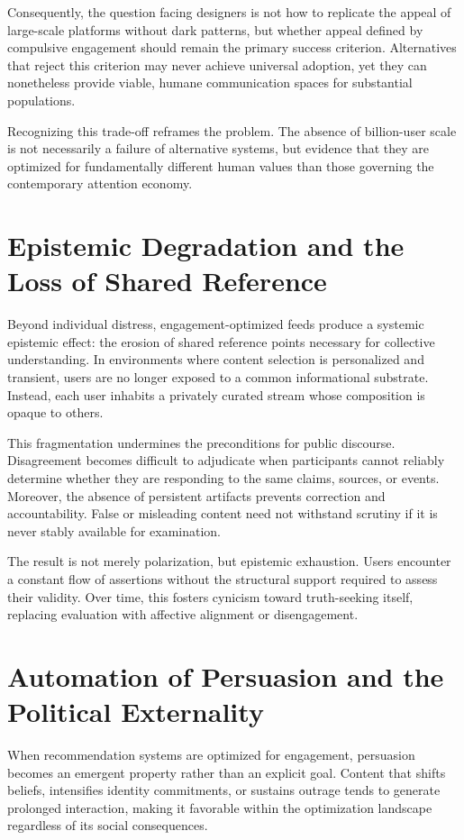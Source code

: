 \documentclass[12pt]{article}
\begin{document}
Consequently, the question facing designers is not how to replicate the appeal of large-scale platforms without dark patterns, but whether appeal defined by compulsive engagement should remain the primary success criterion. Alternatives that reject this criterion may never achieve universal adoption, yet they can nonetheless provide viable, humane communication spaces for substantial populations.

Recognizing this trade-off reframes the problem. The absence of billion-user scale is not necessarily a failure of alternative systems, but evidence that they are optimized for fundamentally different human values than those governing the contemporary attention economy.

\section{Epistemic Degradation and the Loss of Shared Reference}

Beyond individual distress, engagement-optimized feeds produce a systemic epistemic effect: the erosion of shared reference points necessary for collective understanding. In environments where content selection is personalized and transient, users are no longer exposed to a common informational substrate. Instead, each user inhabits a privately curated stream whose composition is opaque to others.

This fragmentation undermines the preconditions for public discourse. Disagreement becomes difficult to adjudicate when participants cannot reliably determine whether they are responding to the same claims, sources, or events. Moreover, the absence of persistent artifacts prevents correction and accountability. False or misleading content need not withstand scrutiny if it is never stably available for examination.

The result is not merely polarization, but epistemic exhaustion. Users encounter a constant flow of assertions without the structural support required to assess their validity. Over time, this fosters cynicism toward truth-seeking itself, replacing evaluation with affective alignment or disengagement.

\section{Automation of Persuasion and the Political Externality}

When recommendation systems are optimized for engagement, persuasion becomes an emergent property rather than an explicit goal. Content that shifts beliefs, intensifies identity commitments, or sustains outrage tends to generate prolonged interaction, making it favorable within the optimization landscape regardless of its social consequences.
\end{document}
